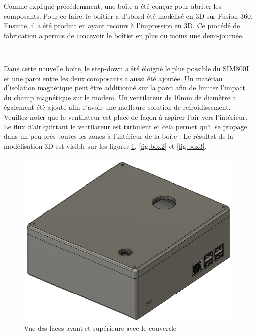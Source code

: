 \noindent
 Comme expliqué précédemment, une boîte a été conçue pour abriter les composants. Pour ce faire, le boîtier a d’abord été modélisé en 3D sur Fusion 360. Ensuite, il a été produit en ayant recours à l’impression en 3D. Ce procédé de fabrication a permis de concevoir le boîtier en plus ou moins une demi-journée.

 ~

 \noindent
Dans cette nouvelle boîte, le step-down a été éloigné le plus possible du SIM800L et une paroi entre les deux composants a aussi été ajoutée. Un matériau d’isolation magnétique peut être additionné sur la paroi afin de limiter l’impact du champ magnétique sur le modem. Un ventilateur de 10mm de diamètre a également été ajouté afin d’avoir une meilleure solution de refroidissement. Veuillez noter que le ventilateur est placé de façon à aspirer l’air vers l’intérieur. Le flux d’air quittant le ventilateur est turbulent et cela permet qu’il se propage dans un peu près toutes les zones à l’intérieur de la boîte \cite{cooling}. Le résultat de la modélisation 3D est visible sur les figures \ref{fig:box1}, \ref{fig:box2} et \ref{fig:box3}.



\begin{figure}[ht!]
  \centering
  \includegraphics[scale=0.4]{img/el_prototype/box1}
  \caption{Vue des faces avant et supérieure avec le couvercle}
  \label{fig:box1}
\end{figure}


